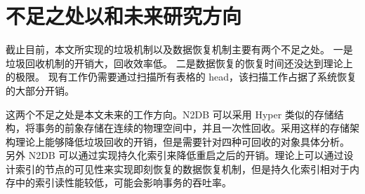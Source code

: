 \section{不足之处以和未来研究方向}

截止目前，本文所实现的垃圾机制以及数据恢复机制主要有两个不足之处。
一是垃圾回收机制的开销大，回收效率低。
二是数据恢复的恢复时间还没达到理论上的极限。
现有工作仍需要通过扫描所有表格的 head，该扫描工作占据了系统恢复的大部分开销。

这两个不足之处是本文未来的工作方向。N2DB 可以采用 Hyper 类似的存储结构，将事务的前象存储在连续的物理空间中，并且一次性回收。采用这样的存储架构理论上能够降低垃圾回收的开销，但是需要针对四种可回收的对象具体分析。
另外 N2DB 可以通过实现持久化索引来降低重启之后的开销。理论上可以通过设计索引的节点的可见性来实现即刻恢复的数据恢复机制，但是持久化索引相对于内存中的索引读性能较低，可能会影响事务的吞吐率。
